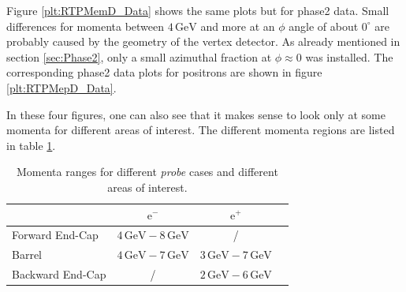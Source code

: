 \documentclass[a4paper,11pt,twosided,final,german,openbib,pdftex,listof=totoc,bibliography=totoc]{scrbook}
\begin{document}
 Figure \ref{plt:RTPMemD_Data} shows the same plots but for phase2 data. Small differences for momenta between $4\,\textrm{GeV}$ and more at an $\phi$ angle of about $0^\circ$ are probably caused by the geometry of the vertex detector. As already mentioned in section \ref{sec:Phase2}, only a small azimuthal fraction at $\phi \approx 0$ was installed.
 The corresponding phase2 data plots for positrons are shown in figure \ref{plt:RTPMepD_Data}.  

In these four figures, one can also see that it makes sense to look only at some momenta for different areas of interest. The different momenta regions are listed in table \ref{tab:RTPMDTable}.


\begin{table}[h!]
	\centering
	\begin{tabular}{lccc}
		&$\textrm{e}^-$ &$\textrm{e}^+$\\
		\hline
		Forward End-Cap &$4\,\textrm{GeV} - 8\,\textrm{GeV}$&/\\
		Barrel &$4\,\textrm{GeV} - 7\,\textrm{GeV}$&$3\,\textrm{GeV} - 7\,\textrm{GeV}$\\
		Backward End-Cap & /&$2\,\textrm{GeV} - 6\,\textrm{GeV}$\\	
	\end{tabular}
	
	\caption[Areas Of Interest Different Momenta Ranges]{Momenta ranges for different \textit{probe} cases and different areas of interest.}
	\label{tab:RTPMDTable}
\end{table}
\end{document}
